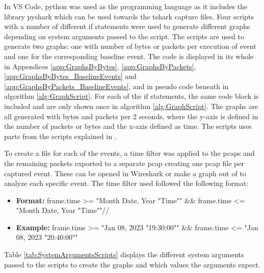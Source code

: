 In \gls{VS Code}, python was used as the programming language as it includes the library pyshark which can be used towards the tshark capture files. Four scripts with a number of different if statements were used to generate different graphs depending on system arguments passed to the script. The scripts are used to generate two graphs: one with number of bytes or packets per execution of event and one for the corresponding baseline event. The code is displayed in its whole in Appendices \ref{app:GraphsByBytes}, \ref{app:GraphsByPackets}, \ref{app:GraphsByBytes_BaselineEvents} and \ref{app:GraphsByPackets_BaselineEvents}, and in pseudo code beneath in algorithm \ref{alg:GraphScript}. For each of the if statements, the same code block is included and are only shown once in algorithm \ref{alg:GraphScript}. The graphs are all generated with bytes and packets per 2 seconds, where the y-axis is defined in the number of packets or bytes and the x-axis defined as time. The scripts uses parts from the scripts explained in \cite{GraphsInspiration}.

To create a file for each of the events, a time filter was applied to the pcaps and the remaining packets exported to a separate pcap creating one pcap file per captured event. These can be opened in Wireshark or make a graph out of to analyze each specific event. The time filter used followed the following format:

\begin{itemize}
\item \textbf{Format:} frame.time >= "Month Date, Year "Time"" \&\& frame.time <= "Month Date, Year "Time""//
\item \textbf{Example:} frame.time >= "Jan 08, 2023 "19:30:00"" \&\& frame.time <= "Jan 08, 2023 "20:40:00""
\end{itemize}

Table \ref{tab:SystemArgumentsScripts} displays the different system arguments passed to the scripts to create the graphs and which values the arguments expect. 

